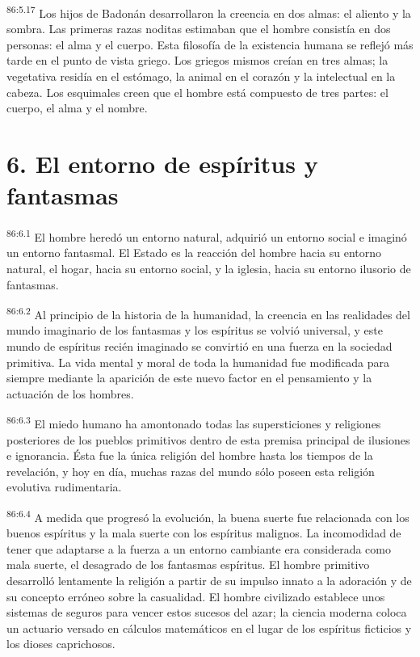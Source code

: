 \par
\textsuperscript{86:5.17} Los hijos de Badonán desarrollaron la creencia en dos almas: el aliento y la sombra. Las primeras razas noditas estimaban que el hombre consistía en dos personas: el alma y el cuerpo. Esta filosofía de la existencia humana se reflejó más tarde en el punto de vista griego. Los griegos mismos creían en tres almas; la vegetativa residía en el estómago, la animal en el corazón y la intelectual en la cabeza. Los esquimales creen que el hombre está compuesto de tres partes: el cuerpo, el alma y el nombre.

\section*{6. El entorno de espíritus y fantasmas}
\par
\textsuperscript{86:6.1} El hombre heredó un entorno natural, adquirió un entorno social e imaginó un entorno fantasmal. El Estado es la reacción del hombre hacia su entorno natural, el hogar, hacia su entorno social, y la iglesia, hacia su entorno ilusorio de fantasmas.

\par
\textsuperscript{86:6.2} Al principio de la historia de la humanidad, la creencia en las realidades del mundo imaginario de los fantasmas y los espíritus se volvió universal, y este mundo de espíritus recién imaginado se convirtió en una fuerza en la sociedad primitiva. La vida mental y moral de toda la humanidad fue modificada para siempre mediante la aparición de este nuevo factor en el pensamiento y la actuación de los hombres.

\par
\textsuperscript{86:6.3} El miedo humano ha amontonado todas las supersticiones y religiones posteriores de los pueblos primitivos dentro de esta premisa principal de ilusiones e ignorancia. Ésta fue la única religión del hombre hasta los tiempos de la revelación, y hoy en día, muchas razas del mundo sólo poseen esta religión evolutiva rudimentaria.

\par
\textsuperscript{86:6.4} A medida que progresó la evolución, la buena suerte fue relacionada con los buenos espíritus y la mala suerte con los espíritus malignos. La incomodidad de tener que adaptarse a la fuerza a un entorno cambiante era considerada como mala suerte, el desagrado de los fantasmas espíritus. El hombre primitivo desarrolló lentamente la religión a partir de su impulso innato a la adoración y de su concepto erróneo sobre la casualidad. El hombre civilizado establece unos sistemas de seguros para vencer estos sucesos del azar; la ciencia moderna coloca un actuario versado en cálculos matemáticos en el lugar de los espíritus ficticios y los dioses caprichosos.

